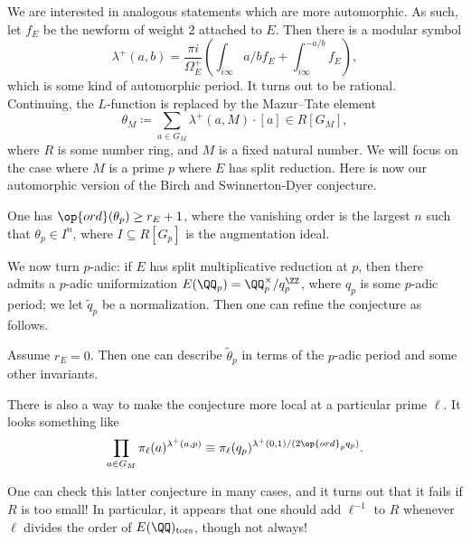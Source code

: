 \documentclass{article}
\begin{document}
We are interested in analogous statements which are more automorphic. As such, let $f_E$ be the newform of weight $2$ attached to $E$. Then there is a modular symbol
\[\lambda^+(a,b)=\frac{\pi i}{\Omega_E^+}\left(\int_{i\infty}{a/b}f_E+\int_{i\infty}^{-a/b}f_E\right),\]
which is some kind of automorphic period. It turns out to be rational. Continuing, the $L$-function is replaced by the Mazur--Tate element
\[\theta_M\coloneqq\sum_{a\in G_M}\lambda^+(a,M)\cdot[a]\in R[G_M],\]
where $R$ is some number ring, and $M$ is a fixed natural number. We will focus on the case where $M$ is a prime $p$ where $E$ has split reduction. Here is now our automorphic version of the Birch and Swinnerton-Dyer conjecture.
\begin{conj}
	One has $\op{ord}(\theta_p)\ge r_E+1$, where the vanishing order is the largest $n$ such that $\theta_p\in I^n$, where $I\subseteq R[G_p]$ is the augmentation ideal.
\end{conj}
We now turn $p$-adic: if $E$ has split multiplicative reduction at $p$, then there admits a $p$-adic uniformization $E(\QQ_p)=\QQ_p^\times/q_p^\ZZ$, where $q_p$ is some $p$-adic period; we let $\widetilde q_p$ be a normalization. Then one can refine the conjecture  as follows.
\begin{conj}
	Assume $r_E=0$. Then one can describe $\widetilde\theta_p$ in terms of the $p$-adic period and some other invariants.
\end{conj}
\begin{remark}
	There is also a way to make the conjecture more local at a particular prime $\ell$. It looks something like
	\[\prod_{a\in G_M}\pi_\ell(a)^{\lambda^+(a,p)}\equiv\pi_\ell(q_p)^{\lambda^+(0,1)/(2\op{ord}_pq_p)}.\]
\end{remark}
One can check this latter conjecture in many cases, and it turns out that it fails if $R$ is too small! In particular, it appears that one should add $\ell^{-1}$ to $R$ whenever $\ell$ divides the order of $E(\QQ)_{\mathrm{tors}}$, though not always!
\end{document}
